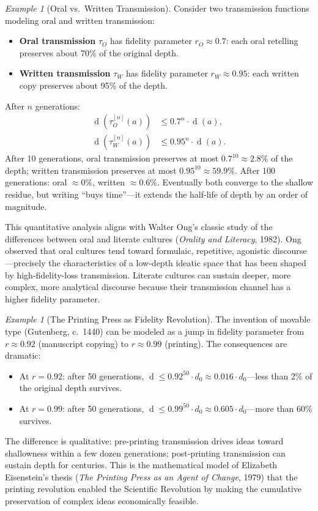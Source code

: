 \documentclass[11pt,openany]{book}
\theoremstyle{definition}
\theoremstyle{plain}
\theoremstyle{remark}
\newtheorem{example}[axiom]{Example}
\newcommand{\depth}{\operatorname{d}}       %
\newcommand{\transmit}{\tau}                 %
\begin{document}
\begin{example}[Oral vs.\ Written Transmission]
Consider two transmission functions modeling oral and written transmission:
\begin{itemize}
\item \textbf{Oral transmission} $\transmit_O$ has fidelity parameter $r_O \approx 0.7$: each oral retelling preserves about 70\% of the original depth.
\item \textbf{Written transmission} $\transmit_W$ has fidelity parameter $r_W \approx 0.95$: each written copy preserves about 95\% of the depth.
\end{itemize}
After $n$ generations:
\begin{align*}
\depth(\transmit_O^{[n]}(a)) &\leq 0.7^n \cdot \depth(a), \\
\depth(\transmit_W^{[n]}(a)) &\leq 0.95^n \cdot \depth(a).
\end{align*}
After 10 generations, oral transmission preserves at most $0.7^{10} \approx 2.8\%$ of the depth; written transmission preserves at most $0.95^{10} \approx 59.9\%$. After 100 generations: oral $\approx 0\%$, written $\approx 0.6\%$. Eventually both converge to the shallow residue, but writing ``buys time''---it extends the half-life of depth by an order of magnitude.

This quantitative analysis aligns with Walter Ong's classic study of the differences between oral and literate cultures (\emph{Orality and Literacy}, 1982). Ong observed that oral cultures tend toward formulaic, repetitive, agonistic discourse---precisely the characteristics of a low-depth ideatic space that has been shaped by high-fidelity-loss transmission. Literate cultures can sustain deeper, more complex, more analytical discourse because their transmission channel has a higher fidelity parameter.
\end{example}

\begin{example}[The Printing Press as Fidelity Revolution]
The invention of movable type (Gutenberg, c.\ 1440) can be modeled as a jump in fidelity parameter from $r \approx 0.92$ (manuscript copying) to $r \approx 0.99$ (printing). The consequences are dramatic:
\begin{itemize}
\item At $r = 0.92$: after 50 generations, $\depth \leq 0.92^{50} \cdot d_0 \approx 0.016 \cdot d_0$---less than 2\% of the original depth survives.
\item At $r = 0.99$: after 50 generations, $\depth \leq 0.99^{50} \cdot d_0 \approx 0.605 \cdot d_0$---more than 60\% survives.
\end{itemize}
The difference is qualitative: pre-printing transmission drives ideas toward shallowness within a few dozen generations; post-printing transmission can sustain depth for centuries. This is the mathematical model of Elizabeth Eisenstein's thesis (\emph{The Printing Press as an Agent of Change}, 1979) that the printing revolution enabled the Scientific Revolution by making the cumulative preservation of complex ideas economically feasible.
\end{example}
\end{document}

